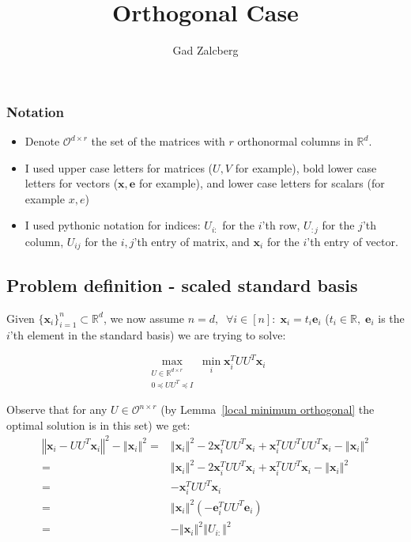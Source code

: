 \documentclass{article}
\title{Orthogonal Case}
\author{Gad Zalcberg}
\newcommand{\Lemmaref}[1]{Lemma~\ref{#1}}
\newcommand{\x}{{\mathbf x}}
\newcommand{\e}{{\mathbf e}}
\newcommand{\cO}{\mathcal{O}}
\newcommand{\orth}[2]{\cO^{#1\times #2}}
\newcommand{\R}{\mathbb{R}}
\begin{document}
\maketitle

\subsubsection{Notation}
\begin{itemize}
    \item Denote $\orth{d}{r}$ the set of the matrices with $r$ orthonormal columns in $\R^d$.
    \item I used upper case letters for matrices ($U,V$ for example), bold lower case letters for vectors ($\x,\e$ for example), and lower case letters for scalars (for example $x,e$)
    \item I used pythonic notation for indices:
    $U_{i:}$ for the $i$'th row, $U_{:j}$ for the $j$'th column, $U_{ij}$ for the $i,j$'th entry of matrix, and $\x_{i}$ for the $i$'th entry of vector.
\end{itemize}

\subsection{Problem definition - scaled standard basis}
Given $\{\x_i\}_{i=1}^n\subset\R^d$, we now assume $n=d,\;\;\forall i\in[n]: \; \x_i=t_i\e_i$ ($t_i\in \mathbb{R},\; \e_i$ is the $i$'th element in the  standard basis) we are trying to solve:

\begin{equation} \label{factorized_problem}
\max_{\begin{array}{c}
U\in\R^{d\times r}\\
0\preceq UU^T\preceq I
\end{array}}\min_{{i}}\x_{i}^{T}UU^T\x_{i}
\end{equation}

Observe that for any $U\in\mathcal{O}^{n\times r}$ (by \Lemmaref{local minimum orthogonal} the optimal solution is in this set) we get:
\begin{align*}
    \left\Vert \x_i-UU^T\x_i\right\Vert^2- \left\Vert \x_{i}\right\Vert ^{2}
    =&\left\Vert \x_{i}\right\Vert^2-2\x_{i}^TUU^T\x_{i}+\x_{i}^TUU^TUU^T\x_{i}- \left\Vert \x_{i}\right\Vert^{2}\\
    =&\left\Vert \x_{i}\right\Vert^2-2\x_{i}^TUU^T\x_{i}+\x_{i}^TUU^T\x_{i} - \left\Vert \x_{i}\right\Vert^{2}\\
    =&-\x_{i}^TUU^T\x_{i} \\
    =&\left\Vert \x_{i}\right\Vert^2\left(-\e_{i}^TUU^T\e_{i}\right) \\
    =& -\left\Vert \x_{i}\right\Vert^2\left\Vert U_{i:}\right\Vert^2
\end{align*}
\end{document}
